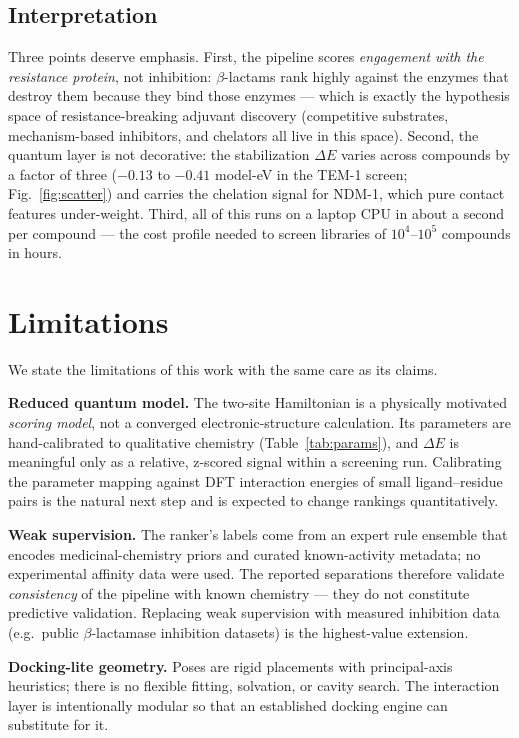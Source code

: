 \documentclass[10pt,twocolumn]{article}
\begin{document}
\subsection{Interpretation}

Three points deserve emphasis. First, the pipeline scores \emph{engagement with the
resistance protein}, not inhibition: $\beta$-lactams rank highly against the enzymes
that destroy them because they bind those enzymes --- which is exactly the hypothesis
space of resistance-breaking adjuvant discovery (competitive substrates, mechanism-based
inhibitors, and chelators all live in this space). Second, the quantum layer is not
decorative: the stabilization $\Delta E$ varies across compounds by a factor of three
($-0.13$ to $-0.41$ model-eV in the TEM-1 screen; Fig.~\ref{fig:scatter}) and carries
the chelation signal for NDM-1, which pure contact features under-weight. Third, all of
this runs on a laptop CPU in about a second per compound --- the cost profile needed to
screen libraries of $10^4$--$10^5$ compounds in hours.

\section{Limitations}
\label{sec:limitations}

We state the limitations of this work with the same care as its claims.

\textbf{Reduced quantum model.} The two-site Hamiltonian is a physically motivated
\emph{scoring model}, not a converged electronic-structure calculation. Its parameters
are hand-calibrated to qualitative chemistry (Table~\ref{tab:params}), and $\Delta E$
is meaningful only as a relative, z-scored signal within a screening run. Calibrating
the parameter mapping against DFT interaction energies of small ligand--residue pairs
is the natural next step and is expected to change rankings quantitatively.

\textbf{Weak supervision.} The ranker's labels come from an expert rule ensemble that
encodes medicinal-chemistry priors and curated known-activity metadata; no experimental
affinity data were used. The reported separations therefore validate \emph{consistency}
of the pipeline with known chemistry --- they do not constitute predictive validation.
Replacing weak supervision with measured inhibition data (e.g.\ public
$\beta$-lactamase inhibition datasets) is the highest-value extension.

\textbf{Docking-lite geometry.} Poses are rigid placements with principal-axis
heuristics; there is no flexible fitting, solvation, or cavity search. The interaction
layer is intentionally modular so that an established docking engine can substitute
for it.
\end{document}
